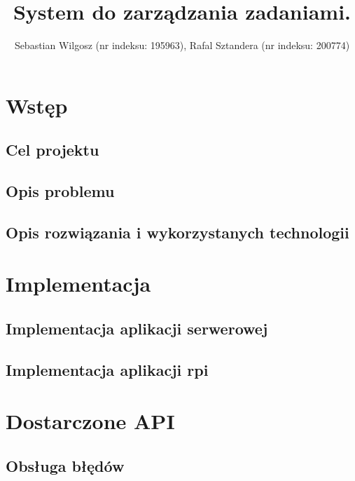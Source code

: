 \documentclass[eng,printmode]{02_class}
\title{System do zarządzania zadaniami.}
\author{Sebastian Wilgosz (nr indeksu: 195963), Rafal Sztandera (nr indeksu: 200774) }
\begin{document}
  \maketitle
  \tableofcontents

  \chapter{Wstęp}
  \label{chapter:introduction}
    \section{Cel projektu}
    \label{section:target}
    

    \section{Opis problemu}
    \label{section:problem}
    

    \section{Opis rozwiązania i wykorzystanych technologii}
    \label{section:solution}
    


  \chapter{Implementacja}
  \label{chapter:implementation}
  

    \section{Implementacja aplikacji serwerowej}
    \label{section:server}
    

    \section{Implementacja aplikacji rpi}
    \label{section:rpi}
    


  \chapter{Dostarczone API}
  \label{chapter:api}
  
    \section{Obsługa błędów}
    \label{section:api-errors}
    
\end{document}
